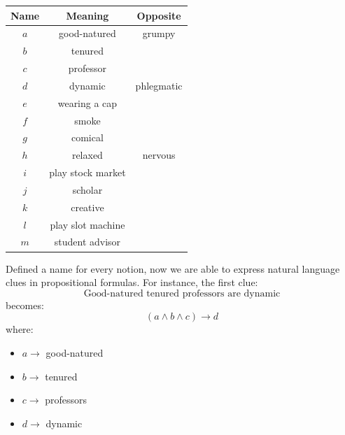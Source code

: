 \begin{example}
    \begin{center}
        \begin{tabular}{|c|c|c|}
            \hline
            \textbf{Name} & \textbf{Meaning} & \textbf{Opposite} \\ \hline
            $a$ & good-natured & grumpy \\ \hline
            $b$ & tenured & \\ \hline
            $c$ & professor & \\ \hline
            $d$ & dynamic & phlegmatic \\ \hline
            $e$ & wearing a cap & \\ \hline
            $f$ & smoke & \\ \hline
            $g$ & comical & \\ \hline
            $h$ & relaxed & nervous \\ \hline
            $i$ & play stock market & \\ \hline
            $j$ & scholar & \\ \hline
            $k$ & creative & \\ \hline
            $l$ & play slot machine & \\ \hline
            $m$ & student advisor & \\ \hline
        \end{tabular}
    \end{center} \vspace{7pt}

    Defined a name for every notion, now we are able to express natural language clues in propositional formulas. For instance, the first clue:
    $$ \text{Good-natured tenured professors are dynamic} $$ 
    becomes:
    $$ (a \wedge b \wedge c) \rightarrow d $$
    where:
    \begin{itemize}
        \renewcommand{\labelitemi}{-}
        \item $a \rightarrow $ good-natured
        \item $b \rightarrow $ tenured
        \item $c \rightarrow$ professors
        \item $d \rightarrow$ dynamic
    \end{itemize} \vspace{7pt}


\end{example}
